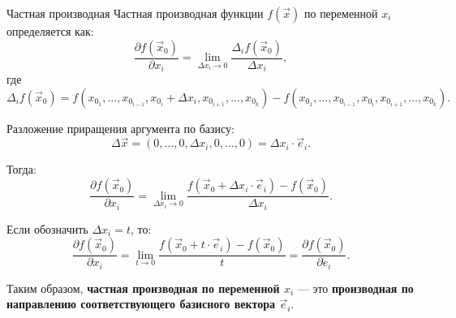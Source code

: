 \begin{tbox}{Частная производная}
	Частная производная функции \(f(\vec{x})\) по переменной \(x_i\) определяется как:
	\begin{equation*}
		\frac{\partial f(\vec{x}_0)}{\partial x_i} = \lim_{\Delta x_i \to 0} \frac{\Delta_i f(\vec{x}_0)}{\Delta x_i},
	\end{equation*}
	где
	\[
	\Delta_i f(\vec{x}_0) = f(x_{0_1}, ..., x_{0_{i-1}}, x_{0_i} + \Delta x_i, x_{0_{i+1}}, ..., x_{0_k}) - f(x_{0_1}, ..., x_{0_{i-1}}, x_{0_i}, x_{0_{i+1}}, ..., x_{0_k}).
	\]

	Разложение приращения аргумента по базису:
	\[
	\Delta \vec{x} = (0, \dots, 0, \Delta x_i, 0, \dots, 0) = \Delta x_i \cdot \vec{e}_i.
	\]

	Тогда:
	\begin{equation*}
		\frac{\partial f(\vec{x}_0)}{\partial x_i} = \lim_{\Delta x_i \to 0} \frac{f(\vec{x}_0 + \Delta x_i \cdot \vec{e}_i) - f(\vec{x}_0)}{\Delta x_i}.
	\end{equation*}

	Если обозначить \(\Delta x_i = t\), то:
	\begin{equation*}
		\frac{\partial f(\vec{x}_0)}{\partial x_i} = \lim_{t \to 0} \frac{f(\vec{x}_0 + t \cdot \vec{e}_i) - f(\vec{x}_0)}{t} = \frac{\partial f(\vec{x}_0)}{\partial e_i}.
	\end{equation*}

	Таким образом, \textbf{частная производная по переменной \(x_i\)} — это \textbf{производная по направлению соответствующего базисного вектора \(\vec{e}_i\)}.
\end{tbox}

